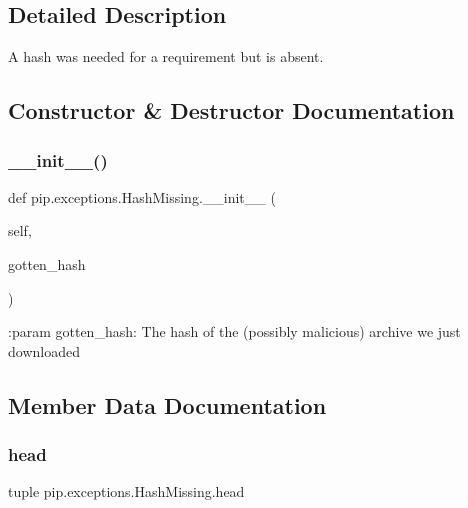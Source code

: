 \subsection{Detailed Description}
\begin{DoxyVerb}A hash was needed for a requirement but is absent.\end{DoxyVerb}
 

\subsection{Constructor \& Destructor Documentation}
\mbox{\label{classpip_1_1exceptions_1_1_hash_missing_a317e8e9bca79a2c1a07e7dc3ff717870}} 
\subsubsection{\texorpdfstring{\+\_\+\+\_\+init\+\_\+\+\_\+()}{\_\_init\_\_()}}
{\footnotesize\ttfamily def pip.\+exceptions.\+Hash\+Missing.\+\_\+\+\_\+init\+\_\+\+\_\+ (\begin{DoxyParamCaption}\item[{}]{self,  }\item[{}]{gotten\+\_\+hash }\end{DoxyParamCaption})}

\begin{DoxyVerb}:param gotten_hash: The hash of the (possibly malicious) archive we
    just downloaded
\end{DoxyVerb}
 

\subsection{Member Data Documentation}
\mbox{\label{classpip_1_1exceptions_1_1_hash_missing_a406ea252f4f34a191a618533c0257e00}} 
\subsubsection{\texorpdfstring{head}{head}}
{\footnotesize\ttfamily tuple pip.\+exceptions.\+Hash\+Missing.\+head\hspace{0.3cm}{\ttfamily [static]}}


